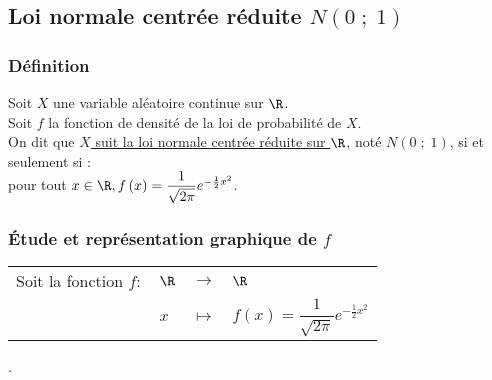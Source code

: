 \subsection{Loi normale centrée réduite $N\left(0 \; ; \; 1\right)$}

\subsubsection{Définition}

Soit $X$ une variable aléatoire continue sur $\R$. \\
Soit $f$ la fonction de densité de la loi de probabilité de $X$. \\

On dit que \underline{$X$ suit la loi normale centrée réduite sur $\R$}, noté $N\left(0 \; ; \; 1\right)$, si et seulement si : \\
pour tout $x \in \R, f\left(x\right) = \dfrac{1}{\sqrt{2\pi}}e^{-\frac{1}{2}x^2}$.

\subsubsection{Étude et représentation graphique de $f$}

\begin{tabular}{llll}
\hspace*{-.3cm} Soit la fonction $f:$ & $\R$ & $\longrightarrow$ & $\R$ \\
& $x$ & $\longmapsto$ & $f(x) = \dfrac{1}{\sqrt{2\pi}}e^{-\frac{1}{2}x^2}$
\end{tabular}. \\

